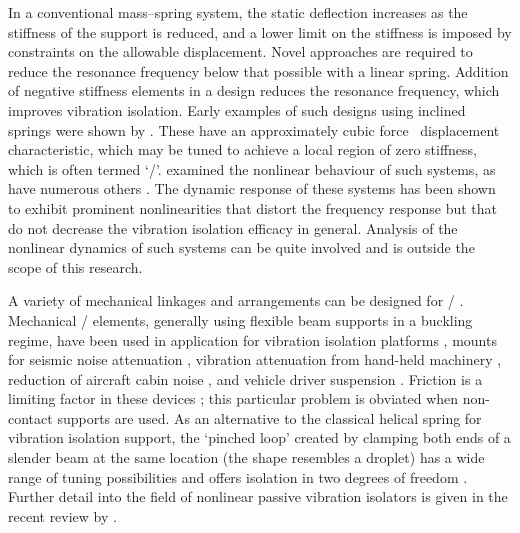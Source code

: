 \documentclass[11pt,a4paper]{memoir}
\begin{document}
In a conventional mass--spring system, the static deflection increases as the stiffness of the support is reduced, and a lower limit on the stiffness is imposed by constraints on the allowable displacement.
Novel approaches are required to reduce the resonance frequency below that possible with a linear spring.
Addition of negative stiffness elements in a design reduces the resonance frequency, which improves vibration isolation.
Early examples of such designs using inclined springs were shown by \textcite{molyneux1957}.
These have an approximately cubic force \vs\ displacement characteristic, which may be tuned to achieve a local region of zero stiffness, which is often termed `\qzs/'.
\textcite{alabuzhev1989} examined the nonlinear behaviour of such
systems, as have numerous others
\cite{carrella2007-jsv,kovacic2008,carrella2009-jsv}.
The dynamic response of these systems has been shown to exhibit prominent nonlinearities that distort the frequency response but that do not decrease the vibration isolation efficacy in general.
Analysis of the nonlinear dynamics of such systems \cite{lee2004-jsv,kovacic2008,kovacic2009} can be quite involved and is outside the scope of this research.

A variety of mechanical linkages and arrangements can be designed for \qzs/ \cite{tarnai2003}.
Mechanical \qzs/ elements, generally using flexible beam supports in a buckling regime, have been used in application for vibration isolation platforms \cite{platus1999}, mounts for seismic noise attenuation \cite{cella2005}, vibration attenuation from hand-held machinery \cite{sokolov2007}, reduction of aircraft cabin noise \cite{baklanov2007-jsv}, and vehicle driver suspension \cite{lee2007-jsv}.
Friction is a limiting factor in these devices \cite{sokolov2007}; this particular problem is obviated when non-contact supports are used.
As an alternative to the classical helical spring for vibration isolation support, the `pinched loop' created by clamping both ends of a slender beam at the same location (the shape resembles a droplet) has a wide range of tuning possibilities and offers isolation in two degrees of freedom \parencite{virgin2008}.
Further detail into the field  of nonlinear passive vibration isolators is given in the recent review by \textcite{ibrahim2008}.
\end{document}
